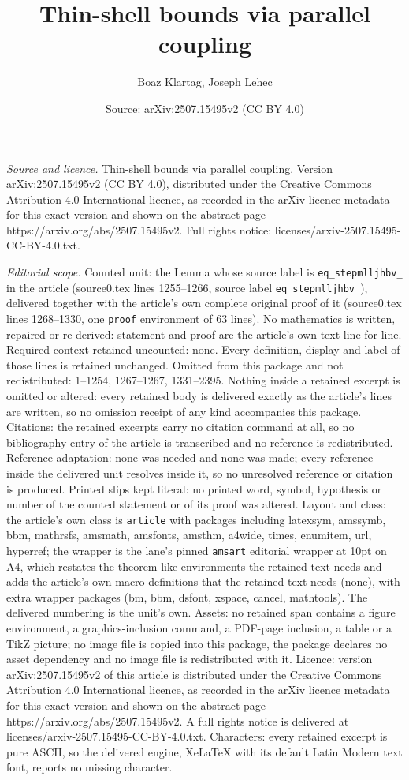 \documentclass[10pt,a4paper]{amsart}
\title[Thin-shell bounds via parallel coupling]{Thin-shell bounds via parallel coupling}
\author{Boaz Klartag, Joseph Lehec}
\date{Source: arXiv:2507.15495v2 (CC BY 4.0)}
\begin{document}
\maketitle

\noindent\emph{Source and licence.} Thin-shell bounds via parallel coupling. Version arXiv:2507.15495v2 (CC BY 4.0), distributed under the Creative Commons Attribution 4.0 International licence, as recorded in the arXiv licence metadata for this exact version and shown on the abstract page https://arxiv.org/abs/2507.15495v2. Full rights notice: licenses/arxiv-2507.15495-CC-BY-4.0.txt.\par\smallskip

\noindent\textit{Editorial scope.} Counted unit: the Lemma whose source label is \texttt{eq\_stepmlljhbv\_} in the article (source0.tex lines 1255--1266, source label \texttt{eq\_stepmlljhbv\_}), delivered together with the article's own complete original proof of it (source0.tex lines 1268--1330, one \texttt{proof} environment of 63 lines). No mathematics is written, repaired or re-derived: statement and proof are the article's own text line for line. Required context retained uncounted: none. Every definition, display and label of those lines is retained unchanged. Omitted from this package and not redistributed: 1--1254, 1267--1267, 1331--2395. Nothing inside a retained excerpt is omitted or altered: every retained body is delivered exactly as the article's lines are written, so no omission receipt of any kind accompanies this package. Citations: the retained excerpts carry no citation command at all, so no bibliography entry of the article is transcribed and no reference is redistributed. Reference adaptation: none was needed and none was made; every reference inside the delivered unit resolves inside it, so no unresolved reference or citation is produced. Printed slips kept literal: no printed word, symbol, hypothesis or number of the counted statement or of its proof was altered. Layout and class: the article's own class is \texttt{article} with packages including latexsym, amssymb, bbm, mathrsfs, amsmath, amsfonts, amsthm, a4wide, times, enumitem, url, hyperref; the wrapper is the lane's pinned \texttt{amsart} editorial wrapper at 10pt on A4, which restates the theorem-like environments the retained text needs and adds the article's own macro definitions that the retained text needs (none), with extra wrapper packages (bm, bbm, dsfont, xspace, cancel, mathtools). The delivered numbering is the unit's own. Assets: no retained span contains a figure environment, a graphics-inclusion command, a PDF-page inclusion, a table or a TikZ picture; no image file is copied into this package, the package declares no asset dependency and no image file is redistributed with it. Licence: version arXiv:2507.15495v2 of this article is distributed under the Creative Commons Attribution 4.0 International licence, as recorded in the arXiv licence metadata for this exact version and shown on the abstract page https://arxiv.org/abs/2507.15495v2. A full rights notice is delivered at licenses/arxiv-2507.15495-CC-BY-4.0.txt. Characters: every retained excerpt is pure ASCII, so the delivered engine, XeLaTeX with its default Latin Modern text font, reports no missing character.
\end{document}

